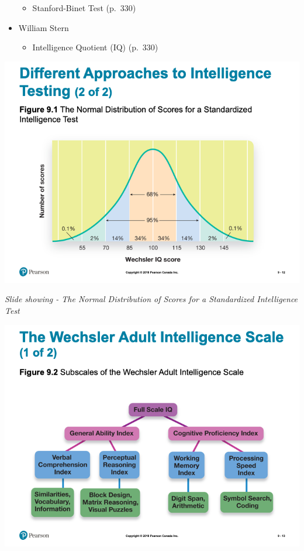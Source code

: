\documentclass[
]{book}
\providecommand{\tightlist}{%
  \setlength{\itemsep}{0pt}\setlength{\parskip}{0pt}}
\begin{document}
\begin{reflect}
\begin{itemize}
  \begin{itemize}
  \tightlist
  \item
    Stanford-Binet Test (p.~330)\\
  \end{itemize}
\item
  William Stern

  \begin{itemize}
  \tightlist
  \item
    Intelligence Quotient (IQ) (p.~330)
  \end{itemize}
\end{itemize}

\includegraphics{assets/unit_2/slide_12.png}

\emph{Slide showing - The Normal Distribution of Scores for a Standardized Intelligence Test}

\includegraphics{assets/unit_2/slide_13.png}


\end{reflect}
\end{document}
